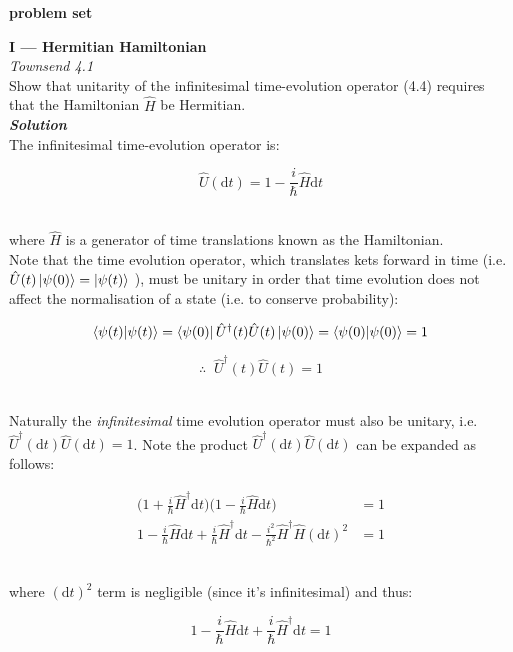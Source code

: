 \documentclass[14pt]{extarticle}
\newcommand{\bfit}[1]{\textbf{\textit{#1}}}
\renewcommand{\d}{\text{d}}
\begin{document}
\setlength{\parindent}{0pt}





{\LARGE \bf problem set} 

\noindent \hrulefill

\hfill

\hfill




{\bf \large I --- Hermitian Hamiltonian} \\

{\it Townsend 4.1} \\ 
Show that unitarity of the infinitesimal time-evolution operator (4.4) requires that the Hamiltonian $\hat H$ be Hermitian. \\ 

{\bfit{Solution}} \\ 
The infinitesimal time-evolution operator is:

$$\hat U (\d t) = 1 - \frac i \hbar \hat H \d t$$ \ 

where $\hat H$ is a generator of time translations known as the Hamiltonian. \\ 

Note that the time evolution operator, which translates kets forward in time (i.e. $\hat U(t) \ket{\psi(0)} = \ket{\psi(t)}$ ), must be unitary in order that time evolution does not affect the normalisation of a state (i.e. to conserve probability):

$$\bra{\psi(t)}\ket{\psi(t)} = \bra{\psi(0)} \hat U^\dagger(t) \hat U(t) \ket{\psi(0)} = \bra{\psi(0)}\ket{\psi(0)} = 1$$ 

$$\therefore \;\; \hat U^\dagger (t) \hat U (t) = 1$$ \

Naturally the {\it infinitesimal} time evolution operator must also be unitary, i.e. $\hat U^\dagger (\d t) \hat U (\d t) = 1$. Note the product $\hat U^\dagger (\d t) \hat U (\d t)$ can be expanded as follows:  

$$
\begin{aligned}
	\bigg( 1 + \frac i \hbar \hat H^\dagger \d t \bigg) \bigg( 1 - \frac i \hbar \hat H \d t \bigg) &= 1 \\ 
	1 - \frac i \hbar \hat H \d t + \frac i \hbar \hat H^\dagger \d t - \frac{i^2}{\hbar^2} \hat H^\dagger \hat H (\d t)^2 &= 1
\end{aligned}
$$ \ 

where $(\d t)^2$ term is negligible (since it's infinitesimal) and thus:

$$1 - \frac i \hbar \hat H \d t + \frac i \hbar \hat H^\dagger \d t = 1$$ \ 
\end{document}
